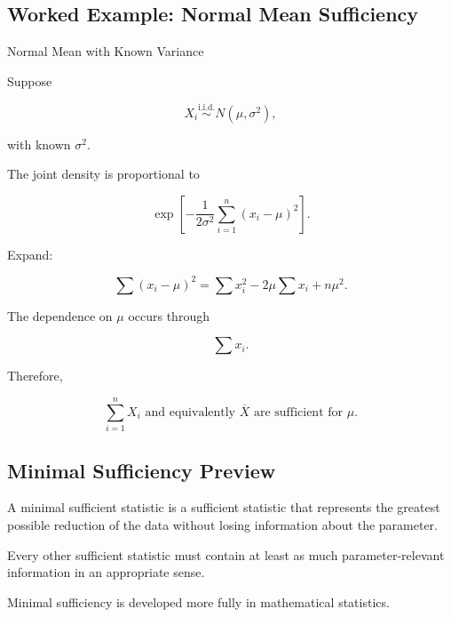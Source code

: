 \subsection{Worked Example: Normal Mean Sufficiency}
\label{subsec:worked-normal-mean-sufficiency}

\begin{workedexamplebox}{Normal Mean with Known Variance}

Suppose

\[
X_i
\overset{\text{i.i.d.}}{\sim}
N(\mu,\sigma^2),
\]

with known \(\sigma^2\).

The joint density is proportional to

\[
\exp
\left[
-\frac1{2\sigma^2}
\sum_{i=1}^{n}
(x_i-\mu)^2
\right].
\]

Expand:

\[
\sum(x_i-\mu)^2
=
\sum x_i^2
-
2\mu\sum x_i
+
n\mu^2.
\]

The dependence on \(\mu\) occurs through

\[
\sum x_i.
\]

Therefore,

\begin{answerbox}
\[
\boxed{
\sum_{i=1}^{n}X_i
\text{ and equivalently }\overline{X}
\text{ are sufficient for }\mu.
}
\]
\end{answerbox}

\end{workedexamplebox}

\subsection{Minimal Sufficiency Preview}
\label{subsec:minimal-sufficiency-preview}

A minimal sufficient statistic is a sufficient statistic that represents
the greatest possible reduction of the data without losing information
about the parameter.

Every other sufficient statistic must contain at least as much
parameter-relevant information in an appropriate sense.

Minimal sufficiency is developed more fully in mathematical statistics.

